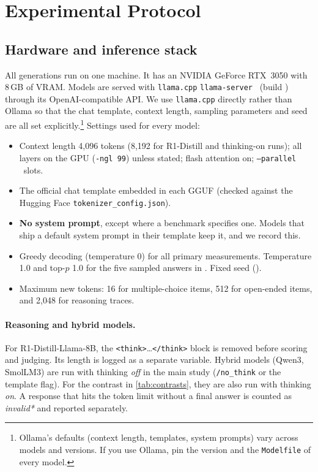 \section{Experimental Protocol}
\label{sec:method}

\subsection{Hardware and inference stack}
All generations run on one machine.  It has an NVIDIA
GeForce RTX~3050 with 8\,GB of VRAM. Models are served with \texttt{llama.cpp}
\texttt{llama-server}~\citep{gerganov2023llamacpp} (build \TBD) through its
OpenAI-compatible API. We use \texttt{llama.cpp} directly rather than Ollama so that
the chat template, context length, sampling parameters and seed are all set
explicitly.\footnote{Ollama's defaults (context length, templates, system prompts)
vary across models and versions. If you use Ollama, pin the version and the
\texttt{Modelfile} of every model.} Settings used for every model:
\begin{itemize}[leftmargin=1.5em,itemsep=1pt]
  \item Context length 4{,}096 tokens (8{,}192 for R1-Distill and thinking-on runs);
  all layers on the GPU (\texttt{-ngl 99}) unless stated; flash attention on;
  \texttt{--parallel} \TBD\ slots.
  \item The official chat template embedded in each GGUF (checked against the Hugging
  Face \texttt{tokenizer\_config.json}).
  \item \textbf{No system prompt}, except where a benchmark specifies one. Models
  that ship a default system prompt in their template keep it, and we record this.
  \item Greedy decoding (temperature 0) for all primary measurements. Temperature 1.0
  and top-$p$ 1.0 for the five sampled answers in . Fixed seed (\TBD).
  \item Maximum new tokens: 16 for multiple-choice items, 512 for open-ended items,
  and 2{,}048 for reasoning traces.
\end{itemize}

\paragraph{Reasoning and hybrid models.} For R1-Distill-Llama-8B, the
\texttt{<think>}\ldots\texttt{</think>} block is removed before scoring and judging.
Its length is logged as a separate variable. Hybrid models (Qwen3, SmolLM3) are run
with thinking \emph{off} in the main study (\texttt{/no\_think} or the template
flag). For the contrast in \cref{tab:contrasts}, they are also run with thinking
\emph{on}. A response that hits the token limit without a final answer is counted as
\emph{invalid*} and reported separately.

